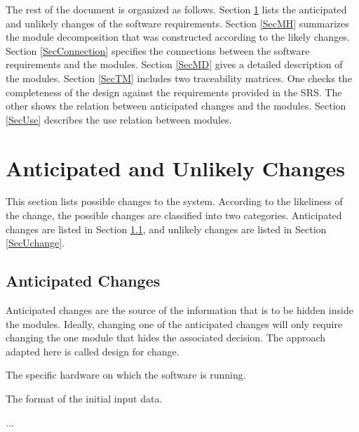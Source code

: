 \documentclass[12pt, titlepage]{article}
\newcounter{acnum}
\newcommand{\actheacnum}{AC\theacnum}
\begin{document}
The rest of the document is organized as follows. Section
\ref{SecChange} lists the anticipated and unlikely changes of the software
requirements. Section \ref{SecMH} summarizes the module decomposition that
was constructed according to the likely changes. Section \ref{SecConnection}
specifies the connections between the software requirements and the
modules. Section \ref{SecMD} gives a detailed description of the
modules. Section \ref{SecTM} includes two traceability matrices. One checks
the completeness of the design against the requirements provided in the SRS. The
other shows the relation between anticipated changes and the modules. Section
\ref{SecUse} describes the use relation between modules.

\section{Anticipated and Unlikely Changes} \label{SecChange}

This section lists possible changes to the system. According to the likeliness
of the change, the possible changes are classified into two
categories. Anticipated changes are listed in Section \ref{SecAchange}, and
unlikely changes are listed in Section \ref{SecUchange}.

\subsection{Anticipated Changes} \label{SecAchange}

Anticipated changes are the source of the information that is to be hidden
inside the modules. Ideally, changing one of the anticipated changes will only
require changing the one module that hides the associated decision. The approach
adapted here is called design for
change.

\begin{description}
\item[ \actheacnum \label{acHardware}:] The specific
  hardware on which the software is running.
\item[ \actheacnum \label{acInput}:] The format of the
  initial input data.
\item ...
\end{description}

\end{document}
